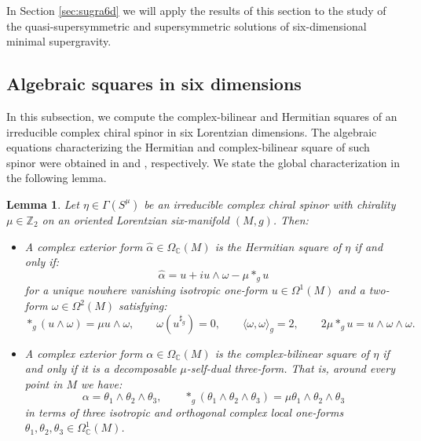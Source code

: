 \documentclass[10pt,a4paper,twoside,reqno]{amsart}
\theoremstyle{plain}
\newtheorem{lemma}[thm]{Lemma}
\theoremstyle{definition}
\theoremstyle{remark}
\def\Z{\mathbb{Z}}
\def\C{\mathbb{C}}
\newcommand{\escal}[1]{\langle#1\rangle}
\begin{document}
In Section \ref{sec:sugra6d} we will apply the results of this section to the study of the quasi-supersymmetric and supersymmetric solutions of six-dimensional minimal supergravity. 


\subsection{Algebraic squares in six dimensions}


In this subsection, we compute the complex-bilinear and Hermitian squares of an irreducible complex chiral spinor in six Lorentzian dimensions. The algebraic equations characterizing the Hermitian and complex-bilinear square of such spinor were obtained in \cite[Prop.\ 7.4]{Algebraic_Complex_Square_2025} and \cite[Cor.\ 7.8]{Algebraic_Complex_Square_2025}, respectively. We state the global characterization in the following lemma.

\begin{lemma}\label{lemma:(5,1)_squares}
Let $\eta\in\Gamma(S^\mu)$ be an irreducible complex chiral spinor with chirality $\mu\in\Z_2$ on an oriented Lorentzian six-manifold $(M,g)$. Then: 
\begin{itemize}
\item A complex exterior form $\widehat{\alpha}\in\Omega_\C(M)$ is the Hermitian square of $\eta$ if and only if: $$\widehat{\alpha}=u+iu\wedge\omega-\mu*_{g}u$$ for a unique nowhere vanishing isotropic one-form $u\in\Omega^1(M)$ and a two-form $\omega\in\Omega^2(M)$ satisfying: $$*_g(u\wedge\omega)=\mu u\wedge\omega,\qquad\omega(u^{\sharp_{g}})=0,\qquad \escal{\omega,\omega}_g=2,\qquad 2\mu*_{g}u=u\wedge\omega\wedge\omega.$$
\item A complex exterior form $\alpha\in\Omega_\C(M)$ is the complex-bilinear square of $\eta$ if and only if it is a decomposable $\mu$-self-dual three-form. That is, around every point in $M$ we have: $$\alpha=\theta_1\wedge\theta_2\wedge\theta_3,\qquad *_{g}(\theta_1\wedge\theta_2\wedge\theta_3)=\mu\theta_1\wedge\theta_2\wedge\theta_3$$ 
in terms of three isotropic and orthogonal complex local one-forms $\theta_1,\theta_2,\theta_3\in\Omega^1_\C(M)$.
\end{itemize}
\end{lemma}
\end{document}
